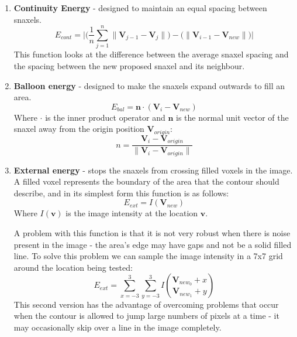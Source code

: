 \begin{enumerate}
	\item \textbf{Continuity Energy} - designed to maintain an equal spacing between snaxels.
		\begin{equation}
			E_{cont} = \Bigg| \bigg( \frac{1}{n} \sum_{j=1}^n\| \mathbf{V}_{j-1} - \mathbf{V}_{j} \| \bigg) - \bigg( \| \mathbf{V}_{i-1} - \mathbf{V}_{new} \| \bigg) \Bigg|
		\end{equation}
		This function looks at the difference between the average snaxel spacing and the spacing between the new proposed snaxel and its neighbour.
	
	\item \textbf{Balloon energy} - designed to make the snaxels expand outwards to fill an area.
		\begin{equation}
			E_{bal} = \mathbf{n} \cdot (\mathbf{V}_{i} - \mathbf{V}_{new})
		\end{equation}
		Where $\cdot$ is the inner product operator and $\mathbf{n}$ is the normal unit vector of the snaxel away from the origin position $\mathbf{V}_{origin}$:
		\begin{equation}
			n = \frac{\mathbf{V}_{i} - \mathbf{V}_{origin}}{\|\mathbf{V}_{i} - \mathbf{V}_{origin}\|}
		\end{equation}

	\item \textbf{External energy} - stops the snaxels from crossing filled voxels in the image.
		A filled voxel represents the boundary of the area that the contour should describe, and in its simplest form this function is as follows:
		\begin{equation}
			E_{ext} = I(\mathbf{V}_{new})
		\end{equation}
		Where $I(\mathbf{v})$ is the image intensity at the location $\mathbf{v}$.
		
		A problem with this function is that it is not very robust when there is noise present in the image - the area's edge may have gaps and not be a solid filled line.
		To solve this problem we can sample the image intensity in a 7x7 grid around the location being tested:
		\begin{equation}
			E_{ext} = \sum_{x=-3}^3 \sum_{y=-3}^3 I \binom{\mathbf{V}_{new_0} + x}{\mathbf{V}_{new_1} + y}
		\end{equation}
		This second version has the advantage of overcoming problems that occur when the contour is allowed to jump large numbers of pixels at a time -
		it may occasionally skip over a line in the image completely.
	

\end{enumerate}
